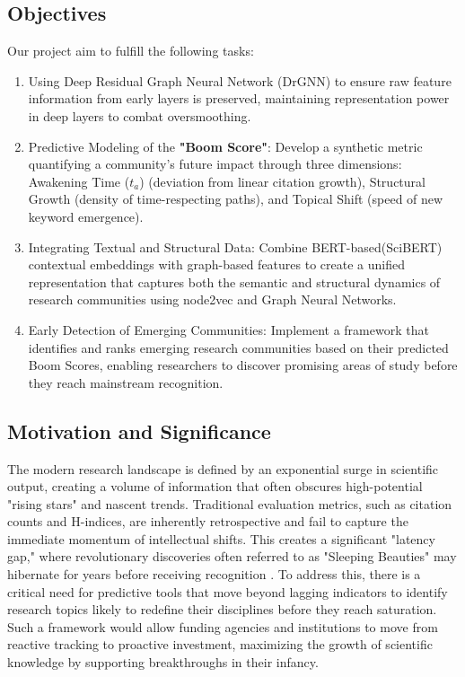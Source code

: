 \documentclass[a4paper,12pt]{article}
\begin{document}
\subsection{Objectives}
Our project aim to fulfill the following tasks:
\vspace{-25pt}
\begin{enumerate}
    \item Using Deep Residual Graph Neural Network (DrGNN) to ensure raw feature information 
    from early layers is preserved, maintaining representation power in deep layers to combat 
    oversmoothing\parencite{zhang_gresnet_2019}.
    \vspace{-10pt}
    \item Predictive Modeling of the \textbf{"Boom Score"}: Develop a synthetic metric 
    quantifying a community's future impact through three dimensions: Awakening Time ($t_{a}$) 
    (deviation from linear citation growth), Structural Growth (density of time-respecting 
    paths), and Topical Shift (speed of new keyword emergence).
    \vspace{-10pt}
    \item Integrating Textual and Structural Data: Combine BERT-based(SciBERT)
    \parencite{beltagy_scibert_2019} contextual embeddings with graph-based features to 
    create a unified representation that captures both the semantic and structural dynamics 
    of research communities using node2vec\parencite{grover_node2vec_2016} and Graph Neural 
    Networks\parencite{kipf_semi-supervised_2016}. 
    \vspace{-10pt}
    \item Early Detection of Emerging Communities: Implement a framework that identifies and 
    ranks emerging research communities based on their predicted Boom Scores, enabling 
    researchers to discover promising areas of study before they reach mainstream recognition.  
\end{enumerate}

\subsection{Motivation and Significance}
The modern research landscape is defined by an exponential surge in scientific output, 
creating a volume of information that often obscures high-potential "rising stars" and 
nascent trends. Traditional evaluation metrics, such as citation counts and H-indices, 
are inherently retrospective and fail to capture the immediate momentum of intellectual 
shifts. This creates a significant "latency gap," where revolutionary discoveries often 
referred to as "Sleeping Beauties" may hibernate for years before receiving recognition
\parencites{van_raan_sleeping_2004}{ke_defining_2015}.  To address this, there 
is a critical need for predictive tools that move beyond lagging indicators to identify 
research topics likely to redefine their disciplines before they reach saturation. Such 
a framework would allow funding agencies and institutions to move from reactive tracking 
to proactive investment, maximizing the growth of scientific knowledge by supporting 
breakthroughs in their infancy.
\end{document}

